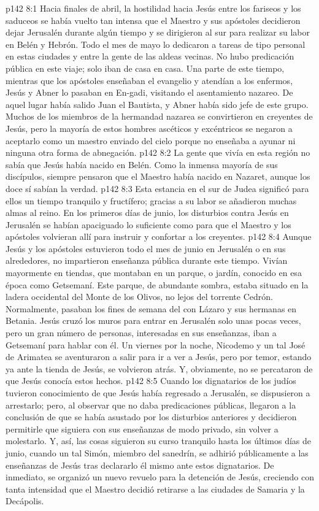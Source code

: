 \vs p142 8:1 Hacia finales de abril, la hostilidad hacia Jesús entre los fariseos y los saduceos se había vuelto tan intensa que el Maestro y sus apóstoles decidieron dejar Jerusalén durante algún tiempo y se dirigieron al sur para realizar su labor en Belén y Hebrón. Todo el mes de mayo lo dedicaron a tareas de tipo personal en estas ciudades y entre la gente de las aldeas vecinas. No hubo predicación pública en este viaje; solo iban de casa en casa. Una parte de este tiempo, mientras que los apóstoles enseñaban el evangelio y atendían a los enfermos, Jesús y Abner lo pasaban en En\hyp{}gadi, visitando el asentamiento nazareo. De aquel lugar había salido Juan el Bautista, y Abner había sido jefe de este grupo. Muchos de los miembros de la hermandad nazarea se convirtieron en creyentes de Jesús, pero la mayoría de estos hombres ascéticos y excéntricos se negaron a aceptarlo como un maestro enviado del cielo porque no enseñaba a ayunar ni ninguna otra forma de abnegación.
\vs p142 8:2 La gente que vivía en esta región no sabía que Jesús había nacido en Belén. Como la inmensa mayoría de sus discípulos, siempre pensaron que el Maestro había nacido en Nazaret, aunque los doce sí sabían la verdad.
\vs p142 8:3 Esta estancia en el sur de Judea significó para ellos un tiempo tranquilo y fructífero; gracias a su labor se añadieron muchas almas al reino. En los primeros días de junio, los disturbios contra Jesús en Jerusalén se habían apaciguado lo suficiente como para que el Maestro y los apóstoles volvieran allí para instruir y confortar a los creyentes.
\vs p142 8:4 Aunque Jesús y los apóstoles estuvieron todo el mes de junio en Jerusalén o en sus alrededores, no impartieron enseñanza pública durante este tiempo. Vivían mayormente en tiendas, que montaban en un parque, o jardín, conocido en esa época como Getsemaní. Este parque, de abundante sombra, estaba situado en la ladera occidental del Monte de los Olivos, no lejos del torrente Cedrón. Normalmente, pasaban los fines de semana del  con Lázaro y sus hermanas en Betania. Jesús cruzó los muros para entrar en Jerusalén solo unas pocas veces, pero un gran número de personas, interesadas en sus enseñanzas, iban a Getsemaní para hablar con él. Un viernes por la noche, Nicodemo y un tal José de Arimatea se aventuraron a salir para ir a ver a Jesús, pero por temor, estando ya ante la tienda de Jesús, se volvieron atrás. Y, obviamente, no se percataron de que Jesús conocía estos hechos.
\vs p142 8:5 Cuando los dignatarios de los judíos tuvieron conocimiento de que Jesús había regresado a Jerusalén, se dispusieron a arrestarlo; pero, al observar que no daba predicaciones públicas, llegaron a la conclusión de que se había asustado por los disturbios anteriores y decidieron permitirle que siguiera con sus enseñanzas de modo privado, sin volver a molestarlo. Y, así, las cosas siguieron su curso tranquilo hasta los últimos días de junio, cuando un tal Simón, miembro del sanedrín, se adhirió públicamente a las enseñanzas de Jesús tras declararlo él mismo ante estos dignatarios. De inmediato, se organizó un nuevo revuelo para la detención de Jesús, creciendo con tanta intensidad que el Maestro decidió retirarse a las ciudades de Samaria y la Decápolis.

